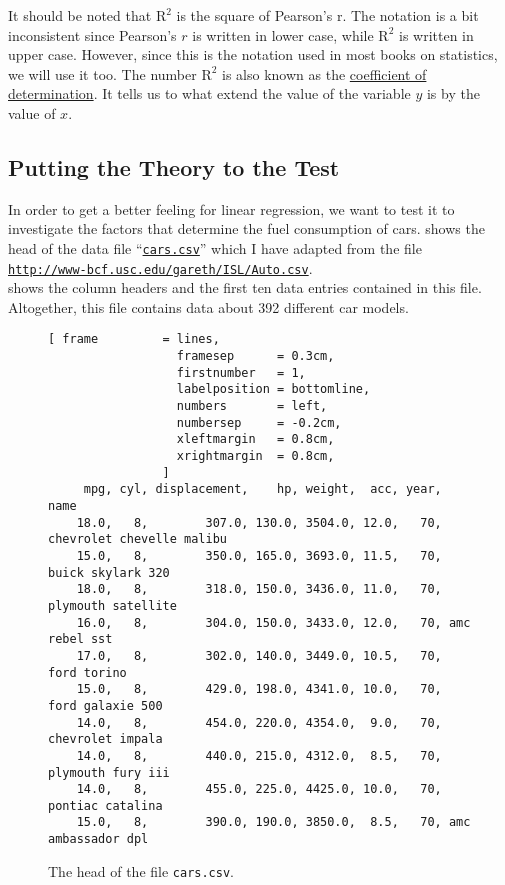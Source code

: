 It should be noted that $\mathrm{R}^2$ is the square of Pearson's \textrm{r}.  The notation is a bit
inconsistent since Pearson's $r$ is written in lower case, while $\mathrm{R}^2$ is written in upper
case.  However, since this is the notation used in most books on statistics, we will use it too.
The number $\mathrm{R}^2$ is also known as the
\href{https://en.wikipedia.org/wiki/Coefficient_of_determination}{coefficient of determination}.  It tells us 
to what extend the value of the variable $y$ is  by the value of $x$.


\subsection{Putting the Theory to the Test}
In order to get a better feeling for linear regression, we want to test it to investigate the factors that
determine the fuel consumption of cars.   shows the head of the data file 
``\href{https://github.com/karlstroetmann/Artificial-Intelligence/blob/master/SetlX/cars.csv}{\texttt{cars.csv}}''
which I have adapted from the file
\\[0.2cm]
\hspace*{1.3cm}
\href{http://www-bcf.usc.edu/~gareth/ISL/Auto.csv}{\texttt{http://www-bcf.usc.edu/gareth/ISL/Auto.csv}}.
\\[0.2cm]
 shows the column headers and the first ten data entries contained in this file.  
Altogether, this file contains data about 392 different car models.

\begin{figure}[!ht]
\centering
\begin{Verbatim}[ frame         = lines, 
                  framesep      = 0.3cm, 
                  firstnumber   = 1,
                  labelposition = bottomline,
                  numbers       = left,
                  numbersep     = -0.2cm,
                  xleftmargin   = 0.8cm,
                  xrightmargin  = 0.8cm,
                ]
     mpg, cyl, displacement,    hp, weight,  acc, year, name
    18.0,   8,        307.0, 130.0, 3504.0, 12.0,   70, chevrolet chevelle malibu
    15.0,   8,        350.0, 165.0, 3693.0, 11.5,   70, buick skylark 320
    18.0,   8,        318.0, 150.0, 3436.0, 11.0,   70, plymouth satellite
    16.0,   8,        304.0, 150.0, 3433.0, 12.0,   70, amc rebel sst
    17.0,   8,        302.0, 140.0, 3449.0, 10.5,   70, ford torino
    15.0,   8,        429.0, 198.0, 4341.0, 10.0,   70, ford galaxie 500
    14.0,   8,        454.0, 220.0, 4354.0,  9.0,   70, chevrolet impala
    14.0,   8,        440.0, 215.0, 4312.0,  8.5,   70, plymouth fury iii
    14.0,   8,        455.0, 225.0, 4425.0, 10.0,   70, pontiac catalina
    15.0,   8,        390.0, 190.0, 3850.0,  8.5,   70, amc ambassador dpl
\end{Verbatim}
\vspace*{-0.3cm}
\caption{The head of the file \texttt{cars.csv}.}
\label{fig:cars.csv}
\end{figure}

